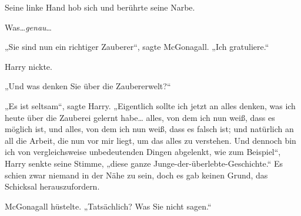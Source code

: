 Seine linke Hand hob sich und berührte seine Narbe.

Was…\emph{genau}…

„Sie sind nun ein richtiger Zauberer“, sagte McGonagall. „Ich gratuliere.“

Harry nickte.

„Und was denken Sie über die Zaubererwelt?“

„Es ist seltsam“, sagte Harry. „Eigentlich sollte ich jetzt an alles denken, was ich heute über die Zauberei gelernt habe… alles, von dem ich nun weiß, dass es möglich ist, und alles, von dem ich nun weiß, dass es falsch ist; und natürlich an all die Arbeit, die nun vor mir liegt, um das alles zu verstehen. Und dennoch bin ich von vergleichsweise unbedeutenden Dingen abgelenkt, wie zum Beispiel“, Harry senkte seine Stimme, „diese ganze Junge-der-überlebte-Geschichte.“ Es schien zwar niemand in der Nähe zu sein, doch es gab keinen Grund, das Schicksal herauszufordern.

McGonagall hüstelte. „Tatsächlich? Was Sie nicht sagen.“

